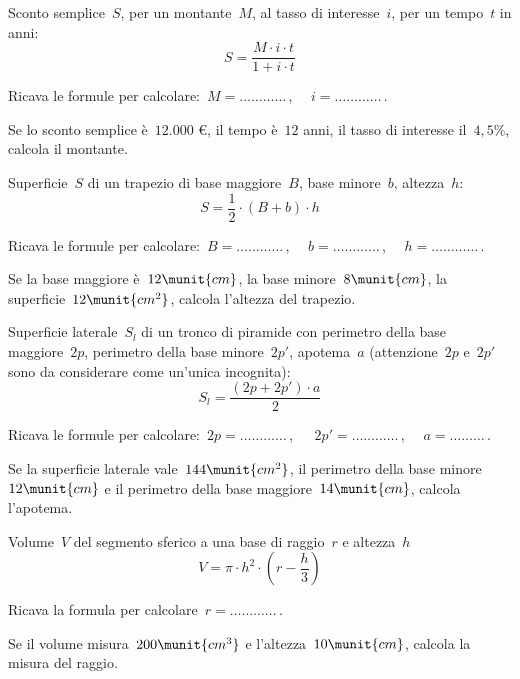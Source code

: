 \begin{esercizio}
\label{ese:20.56}
Sconto semplice~\(S\), per un montante~\(M\), al tasso di interesse~\(i\), per 
un 
tempo~\(t\) in anni:
\begin{equation*}
  S=\frac{M\cdot i\cdot t}{1+i\cdot t}
\end{equation*}

Ricava le formule per calcolare:~\(M=\ldots\ldots\ldots\ldots\)\,, \(\quad 
i=\ldots\ldots\ldots\ldots\)\,.

Se lo sconto semplice è~\(12.000\) €, il tempo è~\(12\) anni, il tasso di 
interesse il~\(4,5\%\), calcola il montante.
\end{esercizio}

\begin{esercizio}
\label{ese:20.57}
Superficie~\(S\) di un trapezio di base maggiore~\(B\), base minore~\(b\), 
altezza~\(h\):
\begin{equation*}
  S=\frac{1}{2}\cdot (B+b)\cdot h
\end{equation*}

Ricava le formule per calcolare:~\(B=\ldots\ldots\ldots\ldots\)\,, \(\quad 
b=\ldots\ldots\ldots\ldots\)\,, \(\quad h =\ldots\ldots\ldots\ldots\)\,.

Se la base maggiore è~\(12\munit{cm}\), la base minore~\(8\munit{cm}\), la 
superficie~\(12\munit{cm^2}\), calcola l'altezza del trapezio.
\end{esercizio}

\begin{esercizio}
\label{ese:20.58}
Superficie laterale~\(S_l\) di un tronco di piramide con perimetro della base 
maggiore~\(2p\), perimetro della base minore~\(2p'\), apotema~\(a\)
(attenzione~\(2p\) e~\(2p'\) sono da considerare come un'unica incognita):
\begin{equation*}
  S_{l}=\frac{(2p+2p')\cdot a}{2}
\end{equation*}

Ricava le formule per calcolare:~\(2p=\ldots\ldots\ldots\ldots\)\,, 
\(\quad~2p'=\ldots\ldots\ldots\ldots\)\,, \(\quad a =\ldots\ldots\ldots\)\,.

Se la superficie laterale vale~\(144\munit{cm^2}\), il perimetro della base 
minore~\(12\munit{cm}\) e il perimetro della base maggiore~\(14\munit{cm}\), 
calcola l'apotema.
\end{esercizio}

\begin{esercizio}
\label{ese:20.59}
Volume~\(V\) del segmento sferico a una base di raggio~\(r\) e altezza~\(h\)
\begin{equation*}
  V=\pi \cdot h^{2}\cdot \left(r-\frac{h}{3}\right)
\end{equation*}

Ricava la formula per calcolare~\(r=\ldots\ldots\ldots\ldots\)\,.

Se il volume misura~\(200\munit{cm^3}\) e l'altezza~\(10\munit{cm}\), calcola 
la misura del raggio.
\end{esercizio}

